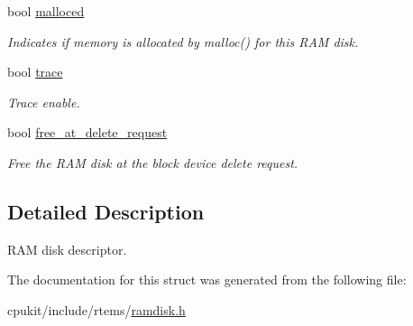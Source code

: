 \begin{DoxyCompactItemize}
\mbox{\label{structramdisk_a78fa3e911930f9d48d863bc693fa0acc}} 
bool \mbox{\hyperlink{structramdisk_a78fa3e911930f9d48d863bc693fa0acc}{malloced}}
\begin{DoxyCompactList}\small\item\em Indicates if memory is allocated by malloc() for this R\+AM disk. \end{DoxyCompactList}\item 
\mbox{\label{structramdisk_ae7ef81c61487581277de5b05c16202f9}} 
bool \mbox{\hyperlink{structramdisk_ae7ef81c61487581277de5b05c16202f9}{trace}}
\begin{DoxyCompactList}\small\item\em Trace enable. \end{DoxyCompactList}\item 
\mbox{\label{structramdisk_aa12d9a2985955c530b417f5457d10f1b}} 
bool \mbox{\hyperlink{structramdisk_aa12d9a2985955c530b417f5457d10f1b}{free\+\_\+at\+\_\+delete\+\_\+request}}
\begin{DoxyCompactList}\small\item\em Free the R\+AM disk at the block device delete request. \end{DoxyCompactList}\end{DoxyCompactItemize}


\subsection{Detailed Description}
R\+AM disk descriptor. 

The documentation for this struct was generated from the following file\+:\begin{DoxyCompactItemize}
\item 
cpukit/include/rtems/\mbox{\hyperlink{ramdisk_8h}{ramdisk.\+h}}\end{DoxyCompactItemize}
